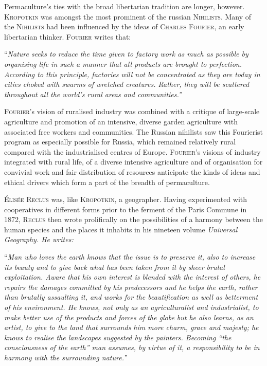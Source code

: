 \documentclass[a4paper, 11pt]{article}
\begin{document}
\begin{multicols*}{2}
  Permaculture's ties with the broad libertarian tradition are longer, however.  \textsc{Kropotkin} was amongst the most prominent of the russian \textsc{Nihilists}. Many of the \textsc{Nihilists} had been influenced by the ideas of \textsc{Charles Fourier}, an early libertarian thinker. \textsc{Fourier} writes that: 

\vspace{1mm}
``\em{Nature seeks to reduce the time given to factory work as much as possible by organising life in such a manner that all products are brought to perfection.  According to this principle, factories will not be concentrated as they are today in cities choked with swarms of wretched creatures.  Rather, they will be scattered throughout all the world's rural areas and communities.}\em''
\vspace{1mm}

\textsc{Fourier}'s vision of ruralised industry was combined with a critique of large-scale agriculture and promotion of an intensive, diverse garden agriculture with associated free workers and communities.  The Russian nihilists saw this Fourierist program as especially possible for Russia, which remained relatively rural compared with the industrialised centres of Europe.  \textsc{Fourier}'s visions of industry integrated with rural life, of a diverse intensive agriculture and of organisation for convivial work and fair distribution of resources anticipate the kinds of ideas and ethical drivers which form a part of the breadth of permaculture.

\textsc{\'Elis\'ee Reclus} was, like \textsc{Kropotkin}, a geographer.  Having experimented with cooperatives in different forms prior to the ferment of the Paris Commune in 1872, \textsc{Reclus} then wrote prolifically on the possibilities of a harmony between the human species and the places it inhabits in his nineteen volume \em{Universal Geography}\em.  He writes:

\vspace{1mm}
``\em{Man who loves the earth knows that the issue is to preserve it, also to increase its beauty and to give back what has been taken from it by sheer brutal exploitation.  Aware that his own interest is blended with the interest of others, he repairs the damages committed by his predecessors and he helps the earth, rather than brutally assaulting it, and works for the beautification as well as betterment of his environment.  He knows, not only as an agriculturalist and industrialist, to make better use of the products and forces of the globe but he also learns, as an artist, to give to the land that surrounds him more charm, grace and majesty; he knows to realise \em{the landscapes suggested by the painters}\em.  Becoming ``the consciousness of the earth'' man assumes, by virtue of it, a responsibility to be in harmony with the surrounding nature.}\em''
\vspace{1mm}


\end{multicols*}
\end{document}
